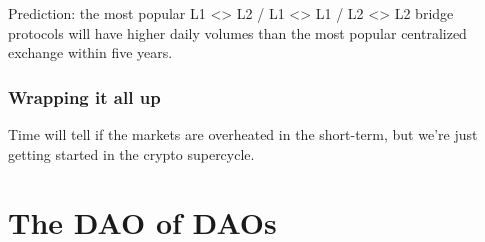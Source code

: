\documentclass{../notes}
\begin{document}
Prediction: the most popular L1 <> L2 / L1 <> L1 / L2 <> L2 bridge protocols will have higher daily volumes than the most popular centralized exchange within five years.

\section{Wrapping it all up}
Time will tell if the markets are overheated in the short-term, but we’re just getting started in the crypto supercycle.

\part{The DAO of DAOs}
\end{document}
